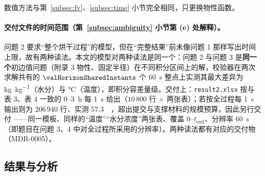 数值方法与第~\ref{subsec:fv}、\ref{subsec:time} 小节完全相同，只更换物性函数。

\paragraph{交付文件的时间范围（第~\ref{subsec:ambiguity} 小节第 (e) 处解释）。}\label{subsec:q2range}
问题 2 要求“整个烘干过程”的模型，但在“完整结果”前未像问题 1 那样写出时间上限，故有两种读法。本文的模型对两种读法是同一个：问题 2 与问题 3 是\textbf{同一个}初边值问题（附录 3 物性、固定半径）在不同积分区间上的解，校验器在两次求解共有的 $\valHorizonSharedInstants$ 个 \SI{60}{\second} 整点上实测其最大差异为 \sci{\valHorizonDiffMoist} \si{\kilo\gram\per\kilo\gram}（水分）与 \sci{\valHorizonDiffTemp} \si{\celsius}（温度），即积分容差量级。交付上：\nolinkurl{result2.xlsx} 按与表 3、表 4 一致的 $0$--\SI{3}{\hour} 每 \SI{1}{\second} 给出（$10\,800$ 行 $\times$ 两张表）；若按全过程每 \SI{1}{\second} 输出则为 $206\,940$ 行、实测 \SI{57.3}{\mega\byte}，超出提交与支撑材料的规模预算，因此另行交付 ——同一模板、同样的“温度”“水分浓度”两张表、覆盖 $0$--$t_{\mathrm{end}}$、分辨率 \SI{60}{\second}（即题目在问题 3、4 中对全过程所采用的分辨率）。两种读法都有对应的交付物（MDR-0005）。

\subsection{结果与分析}






